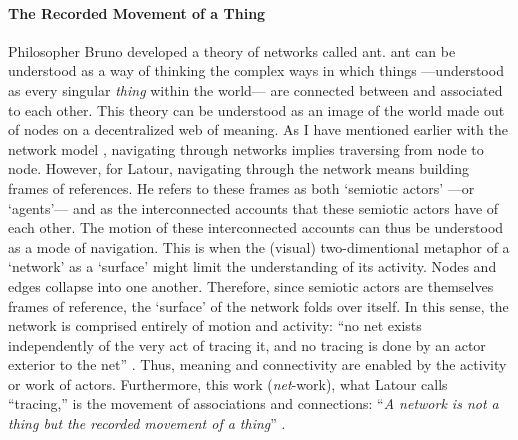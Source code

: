 \paragraph{The Recorded Movement of a Thing}
Philosopher Bruno \textcite{Lat90:On, Lat93:We} developed a theory of networks called \gls{ant}. \gls{ant} can be understood as a way of thinking the complex ways in which things ---understood as every singular \textit{thing} within the world--- are connected between and associated to each other. This theory can be understood as an image of the world made out of nodes on a decentralized web of meaning. As I have mentioned earlier with the network model , navigating through networks implies traversing from node to node. However, for Latour, navigating through the network means building frames of references. He refers to these frames as both `semiotic actors' ---or `agents'--- and as the interconnected accounts that these semiotic actors have of each other. The motion of these interconnected accounts can thus be understood as a mode of navigation. This is when the (visual) two-dimentional metaphor of a `network' as a `surface' might limit the understanding of its activity. Nodes and edges collapse into one another. Therefore, since semiotic actors are themselves frames of reference, the `surface' of the network folds over itself. In this sense, the network is comprised entirely of motion and activity: ``no net exists independently of the very act of tracing it, and no tracing is done by an actor exterior to the net'' \parencite[14]{Lat90:On}. Thus, meaning and connectivity are enabled by the activity or work of actors. Furthermore, this work (\textit{net}-work), what Latour calls ``tracing,'' is the movement of associations and connections: ``\textit{A network is not a thing but the recorded movement of a thing}'' \im \parencite[14]{Lat90:On}.
 

